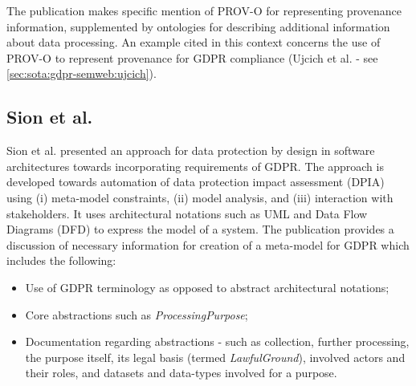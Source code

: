 The publication makes specific mention of PROV-O \cite{lebo_prov-o_2013} for representing provenance information, supplemented by ontologies for describing additional information about data processing.
An example cited in this context concerns the use of PROV-O to represent provenance for GDPR compliance (Ujcich et al. \cite{belhajjame_provenance_2018} - see \autoref{sec:sota:gdpr-semweb:ujcich}).

\subsection*{Sion et al.}
Sion et al. \cite{sion_architectural_2019} presented an approach for data protection by design in software architectures towards incorporating requirements of GDPR. The approach is developed towards automation of data protection impact assessment (DPIA) using (i) meta-model constraints, (ii) model analysis, and  (iii) interaction with stakeholders. It uses architectural notations such as UML and Data Flow Diagrams (DFD) to express the model of a system. The publication provides a discussion of necessary information for creation of a meta-model for GDPR which includes the following:
\begin{itemize}
    \item Use of GDPR terminology as opposed to abstract architectural notations; 
    \item Core abstractions such as \textit{ProcessingPurpose};
    \item Documentation regarding abstractions - such as collection, further processing, the purpose itself, its legal basis (termed \textit{LawfulGround}), involved actors and their roles, and datasets and data-types involved for a purpose.
\end{itemize}

